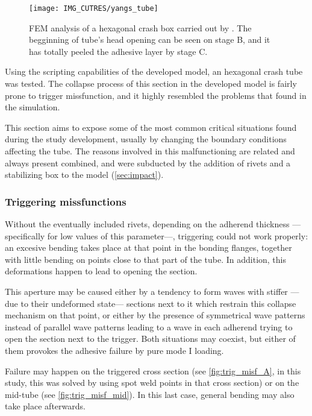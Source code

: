 \documentclass[cmfonts]{witpress}
\begin{document}
\begin{figure}
	\centering
	\texttt{[image: IMG\_CUTRES/yangs\_tube]}
	\caption[FEM analysis of a hexagonal crash box carried out by \cite{Yang2012}.]{FEM analysis of a hexagonal crash box carried out by \cite{Yang2012}. The begginning of tube's head opening can be seen on stage B, and it has totally peeled the adhesive layer by stage C.}
	\label{fig:yangs_tube}
\end{figure}

Using the scripting capabilities of the developed model, an hexagonal crash tube was tested. The collapse process of this section in the developed model is fairly prone to trigger missfunction, and it highly resembled the problems that \cite{Yang2012} found in the simulation.


This section aims to expose some of the most common critical situations found during the study development, usually by changing the boundary conditions affecting the tube. The reasons involved in this malfunctioning are related and always present combined, and were subducted by the addition of rivets and a stabilizing box to the model (\cref{sec:impact}).

\subsubsection{Triggering missfunctions}  %
\label{sec:trig_missf}

Without the eventually included rivets, depending on the adherend thickness ---specifically for low values of this parameter---, triggering could not work properly: an excesive bending takes place at that point in the bonding flanges, together with little bending on points close to that part of the tube. In addition, this deformations happen to lead to opening the section.

This aperture may be caused either by a tendency to form waves with stiffer ---due to their undeformed state--- sections next to it which restrain this collapse mechanism on that point, or either by the presence of symmetrical wave patterns instead of parallel wave patterns leading to a wave in each adherend trying to open the section next to the trigger. Both situations may coexist, but either of them provokes the adhesive failure by pure mode I loading.

Failure may happen on the triggered cross section (see \cref{fig:trig_misf_A}, in this study, this was solved by using spot weld points in that cross section) or on the mid-tube (see \cref{fig:trig_misf_mid}). In this last case, general bending may also take place afterwards.
\end{document}
